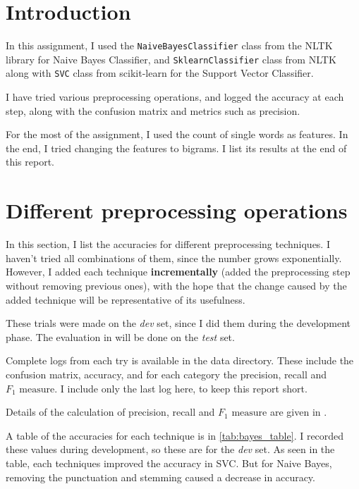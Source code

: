 \section{Introduction}

In this assignment, I used the \texttt{NaiveBayesClassifier} class from the NLTK library for Naive Bayes Classifier, and \texttt{SklearnClassifier} class from NLTK along with \texttt{SVC} class from scikit-learn for the Support Vector Classifier.

I have tried various preprocessing operations, and logged the accuracy at each step, along with the confusion matrix and metrics such as precision.

For the most of the assignment, I used the count of single words as features. In the end, I tried changing the features to bigrams. I list its results at the end of this report.

\section{Different preprocessing operations}
\label{sec:preprocessing}

In this section, I list the accuracies for different preprocessing techniques. I haven't tried all combinations of them, since the number grows exponentially. However, I added each technique \textbf{incrementally} (added the preprocessing step without removing previous ones), with the hope that the change caused by the added technique will be representative of its usefulness.

These trials were made on the \emph{dev} set, since I did them during the development phase. The evaluation in  will be done on the \emph{test} set.

Complete logs from each try is available in the data directory. These include the confusion matrix, accuracy, and for each category the precision, recall and $F_1\text{ measure}$. I include only the last log here, to keep this report short.

Details of the calculation of precision, recall and $F_1\text{ measure}$ are given in .

A table of the accuracies for each technique is in \autoref{tab:bayes_table}. I recorded these values during development, so these are for the \emph{dev} set. As seen in the table, each techniques improved the accuracy in SVC. But for Naive Bayes, removing the punctuation and stemming caused a decrease in accuracy.

